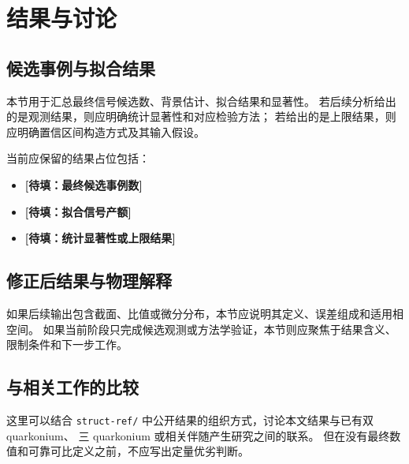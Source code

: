 \chapter{结果与讨论}

\section{候选事例与拟合结果}

本节用于汇总最终信号候选数、背景估计、拟合结果和显著性。
若后续分析给出的是观测结果，则应明确统计显著性和对应检验方法；
若给出的是上限结果，则应明确置信区间构造方式及其输入假设。

当前应保留的结果占位包括：

\begin{itemize}
  \item \textbf{[待填：最终候选事例数]}
  \item \textbf{[待填：拟合信号产额]}
  \item \textbf{[待填：统计显著性或上限结果]}
\end{itemize}

\section{修正后结果与物理解释}

如果后续输出包含截面、比值或微分分布，本节应说明其定义、误差组成和适用相空间。
如果当前阶段只完成候选观测或方法学验证，本节则应聚焦于结果含义、限制条件和下一步工作。

\section{与相关工作的比较}

这里可以结合 \texttt{struct-ref/} 中公开结果的组织方式，讨论本文结果与已有双 quarkonium、
三 quarkonium 或相关伴随产生研究之间的联系。
但在没有最终数值和可靠可比定义之前，不应写出定量优劣判断。
